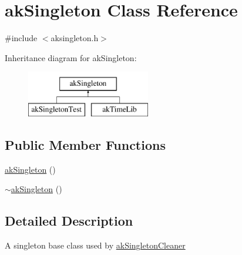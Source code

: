 \hypertarget{classakSingleton}{\section{ak\-Singleton Class Reference}
\label{classakSingleton}
}


{\ttfamily \#include $<$aksingleton.\-h$>$}

Inheritance diagram for ak\-Singleton\-:\begin{figure}[H]
\begin{center}
\leavevmode
\includegraphics[height=2.000000cm]{classakSingleton}
\end{center}
\end{figure}
\subsection*{Public Member Functions}
\begin{DoxyCompactItemize}
\item 
\hyperlink{classakSingleton_aa68086f723700b6b16304b9fe3a8fd29}{ak\-Singleton} ()
\item 
\hyperlink{classakSingleton_a285373122987a0dae45fe3d538f37320}{$\sim$ak\-Singleton} ()
\end{DoxyCompactItemize}


\subsection{Detailed Description}
A singleton base class used by \hyperlink{classakSingletonCleaner}{ak\-Singleton\-Cleaner} 

